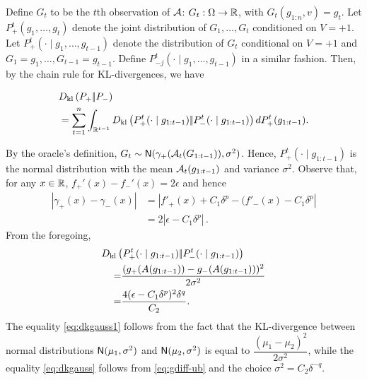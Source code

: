 



Define $G_t$ to be the $t$th observation of $\mathcal{A}$: $G_t:\Omega \to \mathbb{R}$, with $G_t( g_{1:n}, v) = g_t$.
Let $P_+^t(g_1,\dots,g_t)$ denote the joint distribution of $G_1,\dots,G_t$ conditioned on $V=+1$.
Let $P_{+}^t(\cdot\mid g_1,\ldots,g_{t-1})$ denote the distribution of $G_t$ conditional on $V=+1$ and $G_1=g_1,\ldots,G_{t-1}=g_{t-1}$. Define  $P_{-j}^t(\cdot\mid g_1,\ldots,g_{t-1})$ in a similar fashion.
Then, by the chain rule for KL-divergences, we have
\begin{scriptsize}
\begin{align}
&D_{\rm kl}\left({P_{+}} |\!| {P_{-}} \right)\label{eq:dklchain}\\ 
&= \sum_{t=1}^n \int_{\mathbb{R}^{t-1}} D_{\rm kl}\left({P_{+}^t(\cdot\mid g_{1:t-1})} |\!| {P_{-}^t(\cdot\mid g_{1:t-1})} \right) d P_{+}^t( g_{1:t-1}).\nonumber
\end{align}
\end{scriptsize}
By the oracle's definition, $G_t \sim  \mathsf{N}(\gamma_{+}(\mathcal{A}_t(G_{1:t-1})),\sigma^2)$. Hence, 
$P_{+}^t(\cdot\mid g_{1:t-1})$ is the normal distribution with the mean $\mathcal{A}_t(g_{1:t-1})$ and variance $\sigma^2$.
Observe that, for any $x\in \mathbb{R}$, $f_+'(x) - f_-'(x) = 2\epsilon$ and hence
\begin{align}
 |\gamma_+(x) - \gamma_-(x)| 
& = | f'_+(x) + C_1 \delta^p - (f'_-(x)-C_1 \delta^p | \nonumber \\
& = 2| \epsilon - C_1 \delta^p |\,.
 \label{eq:gdiff-ub}
\end{align}
From the foregoing, 
\begin{align}
 \MoveEqLeft \dkl{P_{+}^t(\cdot\mid g_{1:t-1})}{P_{-}^t(\cdot\mid g_{1:t-1})}\nonumber\\
 =&\dfrac{(g_{+}(A(g_{1:t-1})) - g_{-}(A(g_{1:t-1})))^2}{2 \sigma^2}\label{eq:dkgauss1}\\
 =& \dfrac{4(\epsilon-C_1\delta^p)^2\delta^q}{C_2}.\label{eq:dkgauss}
\end{align}
The equality \eqref{eq:dkgauss1} follows from the fact that the KL-divergence between normal distributions $\mathsf{N}(\mu_1,\sigma^2)$ and $\mathsf{N}(\mu_2,\sigma^2)$ is equal to $\dfrac{(\mu_1 - \mu_2)^2}{2 \sigma^2}$, while the equality \eqref{eq:dkgauss} follows from \eqref{eq:gdiff-ub} and the choice $\sigma^2 = C_2 \delta^{-q}$.

